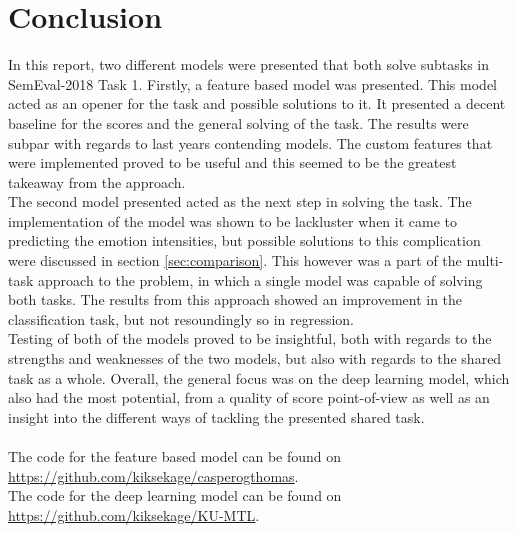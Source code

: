 
\section{Conclusion}
In this report, two different models were presented that both solve subtasks in SemEval-2018 Task 1. Firstly, a feature based model was presented. This model acted as an opener for the task and possible solutions to it. It presented a decent baseline for the scores and the general solving of the task. The results were subpar with regards to last years contending models. The custom features that were implemented proved to be useful and this seemed to be the greatest takeaway from the approach.\\
The second model presented acted as the next step in solving the task. The implementation of the model was shown to be lackluster when it came to predicting the emotion intensities, but possible solutions to this complication were discussed in section \ref{sec:comparison}. This however was a part of the multi-task approach to the problem, in which a single model was capable of solving both tasks. The results from this approach showed an improvement in the classification task, but not resoundingly so in regression.\\
Testing of both of the models proved to be insightful, both with regards to the strengths and weaknesses of the two models, but also with regards to the shared task as a whole. Overall, the general focus was on the deep learning model, which also had the most potential, from a quality of score point-of-view as well as an insight into the different ways of tackling the presented shared task.\\
\\
The code for the feature based model can be found on\\
\href{https://github.com/kiksekage/casperogthomas}{https://github.com/kiksekage/casperogthomas}.\\
The code for the deep learning model can be found on \href{https://github.com/kiksekage/KU-MTL}{https://github.com/kiksekage/KU-MTL}.